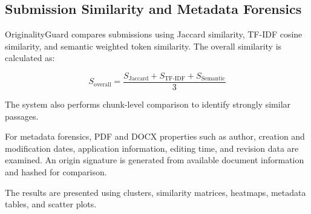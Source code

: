 \documentclass[12pt, a4paper]{report}
\numberwithin{equation}{chapter}
\begin{document}
\subsection{Submission Similarity and Metadata Forensics}

OriginalityGuard compares submissions using Jaccard similarity, TF-IDF
cosine similarity, and semantic weighted token similarity. The overall
similarity is calculated as:

\begin{equation}
S_{\text{overall}} =
\frac{S_{\text{Jaccard}} + S_{\text{TF-IDF}} +
S_{\text{Semantic}}}{3}
\end{equation}

The system also performs chunk-level comparison to identify strongly similar
passages.

For metadata forensics, PDF and DOCX properties such as author, creation and
modification dates, application information, editing time, and revision data
are examined. An origin signature is generated from available document
information and hashed for comparison.

The results are presented using clusters, similarity matrices, heatmaps,
metadata tables, and scatter plots.
\end{document}
